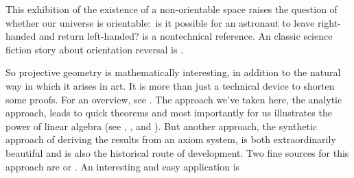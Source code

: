 This exhibition of the existence of a 
non-orientable space raises the question of whether
our universe is orientable:~is it possible for
an astronaut to leave right-handed and return left-handed?
\cite{Gardner} is a nontechnical reference.
An classic science fiction story about 
orientation reversal is \cite{Clarke}.

So projective geometry 
is mathematically interesting,
in addition to the natural way in which it arises in art. 
It is more than just a technical device to shorten some proofs.
For an overview, see \cite{CourantRobbins}. 
The approach we've taken here, the analytic approach,
leads to quick theorems and \Dash  most importantly for us \Dash  illustrates 
the power of linear algebra (see \cite{Hanes}, \cite{Ryan}, and
\cite{Eggar}).
But another approach, the 
synthetic approach of deriving the results
from an axiom system, is both extraordinarily
beautiful and is also the historical route of development.
Two fine sources for this approach are \cite{Coxeter} or \cite{Seidenberg}.
An interesting and easy application is \cite{Davies}

